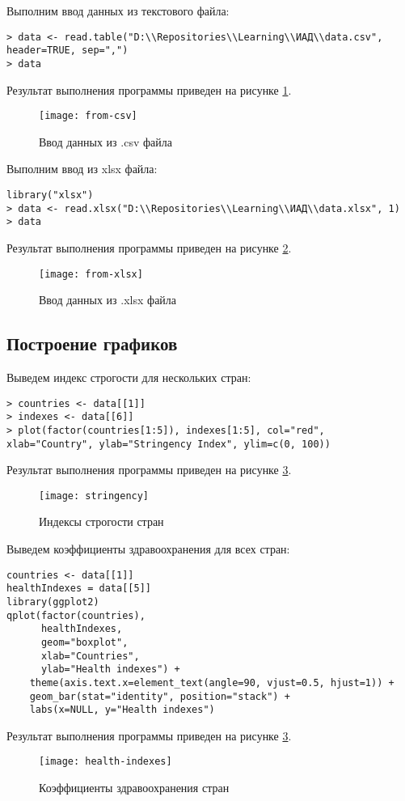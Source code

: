 \documentclass[a4paper,14pt]{extarticle}
\begin{document}
Выполним ввод данных из текстового файла:
\begin{lstlisting}
> data <- read.table("D:\\Repositories\\Learning\\ИАД\\data.csv", header=TRUE, sep=",")
> data
\end{lstlisting}
Результат выполнения программы приведен на рисунке \ref{fig:csv}.
\begin{figure}[H]
    \centering
    \texttt{[image: from-csv]}
    \caption{Ввод данных из .csv файла}
    \label{fig:csv}
\end{figure}

Выполним ввод из xlsx файла:
\begin{lstlisting}
library("xlsx")
> data <- read.xlsx("D:\\Repositories\\Learning\\ИАД\\data.xlsx", 1)
> data
\end{lstlisting}
Результат выполнения программы приведен на рисунке \ref{fig:xlsx}.
\begin{figure}[H]
    \centering
    \texttt{[image: from-xlsx]}
    \caption{Ввод данных из .xlsx файла}
    \label{fig:xlsx}
\end{figure}

\subsection{Построение графиков}
Выведем индекс строгости для нескольких стран:
\begin{lstlisting}
> countries <- data[[1]]
> indexes <- data[[6]]
> plot(factor(countries[1:5]), indexes[1:5], col="red", xlab="Country", ylab="Stringency Index", ylim=c(0, 100))
\end{lstlisting}
Результат выполнения программы приведен на рисунке \ref{fig:stringency}.
\begin{figure}[H]
    \centering
    \texttt{[image: stringency]}
    \caption{Индексы строгости стран}
    \label{fig:stringency}
\end{figure}

Выведем коэффициенты здравоохранения для всех стран:
\begin{lstlisting}
countries <- data[[1]]
healthIndexes = data[[5]]
library(ggplot2)
qplot(factor(countries),
      healthIndexes,
      geom="boxplot",
      xlab="Countries",
      ylab="Health indexes") +
    theme(axis.text.x=element_text(angle=90, vjust=0.5, hjust=1)) +
    geom_bar(stat="identity", position="stack") +
    labs(x=NULL, y="Health indexes")
\end{lstlisting}
Результат выполнения программы приведен на рисунке \ref{fig:stringency}.
\begin{figure}[H]
    \centering
    \texttt{[image: health-indexes]}
    \caption{Коэффициенты здравоохранения стран}
    \label{fig:health-indexes}
\end{figure}
\end{document}
